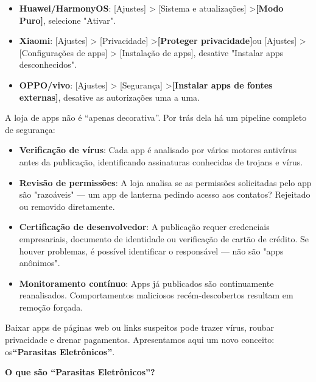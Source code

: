 
\begin{itemize}
  \item \textbf{Huawei/HarmonyOS}: [Ajustes] > [Sistema e atualizações] >\textbf{[Modo Puro]}, selecione "Ativar".
  \item \textbf{Xiaomi}: [Ajustes] > [Privacidade] >\textbf{[Proteger privacidade]}ou [Ajustes] > [Configurações de apps] > [Instalação de apps], desative "Instalar apps desconhecidos".
  \item \textbf{OPPO/vivo}: [Ajustes] > [Segurança] >\textbf{[Instalar apps de fontes externas]}, desative as autorizações uma a uma.
\end{itemize}


A loja de apps não é “apenas decorativa”. Por trás dela há um pipeline completo de segurança:

\begin{itemize}
  \item \textbf{Verificação de vírus}: Cada app é analisado por vários motores antivírus antes da publicação, identificando assinaturas conhecidas de trojans e vírus.
  \item \textbf{Revisão de permissões}: A loja analisa se as permissões solicitadas pelo app são "razoáveis" — um app de lanterna pedindo acesso aos contatos? Rejeitado ou removido diretamente.
  \item \textbf{Certificação de desenvolvedor}: A publicação requer credenciais empresariais, documento de identidade ou verificação de cartão de crédito. Se houver problemas, é possível identificar o responsável — não são "apps anônimos".
  \item \textbf{Monitoramento contínuo}: Apps já publicados são continuamente reanalisados. Comportamentos maliciosos recém-descobertos resultam em remoção forçada.
\end{itemize}


Baixar apps de páginas web ou links suspeitos pode trazer vírus, roubar privacidade e drenar pagamentos. Apresentamos aqui um novo conceito: os\textbf{“Parasitas Eletrônicos”}.

\textbf{O que são “Parasitas Eletrônicos”?}\par

